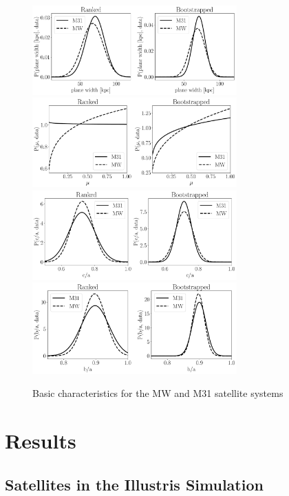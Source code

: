 \documentclass[a4paper,fleqn,usenatbib]{mnras}
\begin{document}
\begin{figure}
\centering
\includegraphics[width=0.7\textwidth]{distribution_width.pdf}
\includegraphics[width=0.7\textwidth]{distribution_mu.pdf}
\includegraphics[width=0.7\textwidth]{distribution_ca_ratio.pdf}
\includegraphics[width=0.7\textwidth]{distribution_ba_ratio.pdf}
\caption{Basic characteristics for the MW and M31 satellite systems
\label{fig:general}}
\end{figure}



\section{Results}
\label{sec:results}





\subsection{Satellites in the Illustris Simulation}
\end{document}
